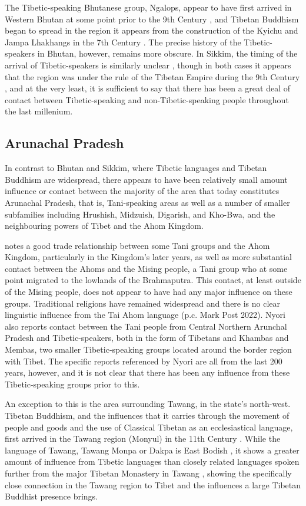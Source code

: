 The Tibetic-speaking Bhutanese group, Ngalops, appear to have first arrived in Western Bhutan at some point prior to the 9th Century \cite{VanDriem2001b}, and Tibetan Buddhism began to spread in the region it appears from the construction of the Kyichu and Jampa Lhakhangs in the 7th Century \cite{Phuntso2014}. The precise history of the Tibetic-speakers in Bhutan, however, remains more obscure. In Sikkim, the timing of the arrival of Tibetic-speakers is similarly unclear \cites{Spengen2010}{Yliniemi2021}, though in both cases it appears that the region was under the rule of the Tibetan Empire during the 9th Century \cite{Schaik2013}, and at the very least, it is sufficient to say that there has been a great deal of contact between Tibetic-speaking and non-Tibetic-speaking people throughout the last millenium.

\subsection{Arunachal Pradesh}\label{ss:History:Arunachal}
In contrast to Bhutan and Sikkim, where Tibetic languages and Tibetan Buddhism are widespread, there appears to have been relatively small amount influence or contact between the majority of the area that today constitutes Arunachal Pradesh, that is, Tani-speaking areas as well as a number of smaller subfamilies including Hrushish, Midzuish, Digarish, and Kho-Bwa, and the neighbouring powers of Tibet and the Ahom Kingdom. 

 notes a good trade relationship between some Tani groups and the Ahom Kingdom, particularly in the Kingdom's later years, as well as more substantial contact between the Ahoms and the Mising people, a Tani group who at some point migrated to the lowlands of the Brahmaputra. This contact, at least outside of the Mising people, does not appear to have had any major influence on these groups. Traditional religions have remained widespread and there is no clear linguistic influence from the Tai Ahom language (p.c. Mark Post 2022). Nyori also reports contact between the Tani people from Central Northern Arunchal Pradesh and Tibetic-speakers, both in the form of Tibetans and Khambas and Membas, two smaller Tibetic-speaking groups located around the border region with Tibet. The specific reports referenced by Nyori are all from the last 200 years, however, and it is not clear that there has been any influence from these Tibetic-speaking groups prior to this.

An exception to this is the area surrounding Tawang, in the state's north-west. Tibetan Buddhism, and the influences that it carries through the movement of people and goods and the use of Classical Tibetan as an ecclesiastical language, first arrived in the Tawang region (Monyul) in the 11th Century \cite{Namgyal2020}. While the language of Tawang, Tawang Monpa or Dakpa is East Bodish \cite{Tombleson2020}, it shows a greater amount of influence from Tibetic languages than closely related languages spoken further from the major Tibetan Monastery in Tawang \cite{vanDriem2007}, showing the specifically close connection in the Tawang region to Tibet and the influences a large Tibetan Buddhist presence brings.


